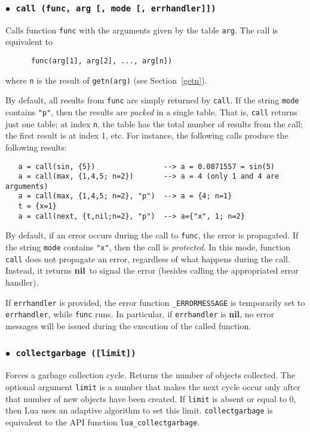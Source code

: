 \documentclass[11pt]{article}
\newcommand{\See}[1]{Section~\ref{#1}}
\newcommand{\see}[1]{(see \See{#1})}
\newcommand{\T}[1]{{\tt #1}}
\newcommand{\nil}{{\bf nil}}
\newcommand{\Deffunc}[1]{\index{#1}}
\newcommand{\ff}{$\bullet$\ }
\begin{document}
\subsubsection*{\ff \T{call (func, arg [, mode [, errhandler]])}}\Deffunc{call}
\label{pdf-call}
Calls function \verb|func| with
the arguments given by the table \verb|arg|.
The call is equivalent to
\begin{verbatim}
      func(arg[1], arg[2], ..., arg[n])
\end{verbatim}
where \verb|n| is the result of \verb|getn(arg)| \see{getn}.

By default,
all results from \verb|func| are simply returned by \verb|call|.
If the string \verb|mode| contains \verb|"p"|,
then the results are \emph{packed} in a single table.
That is, \verb|call| returns just one table;
at index \verb|n|, the table has the total number of results
from the call;
the first result is at index 1, etc.
For instance, the following calls produce the following results:
\begin{verbatim}
   a = call(sin, {5})                --> a = 0.0871557 = sin(5)
   a = call(max, {1,4,5; n=2})       --> a = 4 (only 1 and 4 are arguments)
   a = call(max, {1,4,5; n=2}, "p")  --> a = {4; n=1}
   t = {x=1}
   a = call(next, {t,nil;n=2}, "p")  --> a={"x", 1; n=2}
\end{verbatim}

By default,
if an error occurs during the call to \verb|func|,
the error is propagated.
If the string \verb|mode| contains \verb|"x"|,
then the call is \emph{protected}.
In this mode, function \verb|call| does not propagate an error,
regardless of what happens during the call.
Instead, it returns \nil\ to signal the error
(besides calling the appropriated error handler).

If \verb|errhandler| is provided,
the error function \verb|_ERRORMESSAGE| is temporarily set to \verb|errhandler|,
while \verb|func| runs.
In particular, if \verb|errhandler| is \nil,
no error messages will be issued during the execution of the called function.

\subsubsection*{\ff \T{collectgarbage ([limit])}}\Deffunc{collectgarbage}
Forces a garbage collection cycle.
Returns the number of objects collected.
The optional argument \verb|limit| is a number that
makes the next cycle occur only after that number of new
objects have been created.
If \verb|limit| is absent or equal to 0,
then Lua uses an adaptive algorithm to set this limit.
\verb|collectgarbage| is equivalent to
the API function \verb|lua_collectgarbage|.
\end{document}

